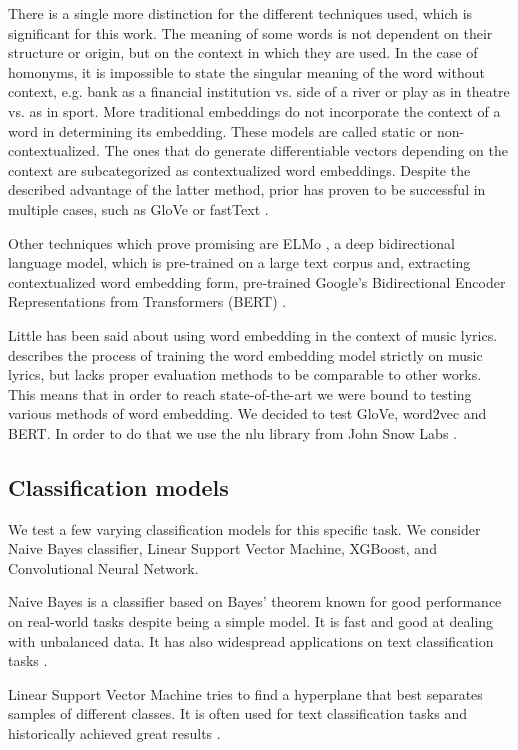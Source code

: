 There is a single more distinction for the different techniques used, which is significant for this work. The meaning of some words is not dependent on their structure or origin, but on the context in which they are used. In the case of homonyms, it is impossible to state the singular meaning of the word without context, e.g. bank as a financial institution vs. side of a river or play as in theatre vs. as in sport. More traditional embeddings do not incorporate the context of a word in determining its embedding. These models are called static or non-contextualized. The ones that do generate differentiable vectors depending on the context are subcategorized as contextualized word embeddings. Despite the described advantage of the latter method, prior has proven to be successful in multiple cases, such as GloVe \cite{glove} or fastText \cite{fastText}.

Other techniques which prove promising are ELMo \cite{elmo}, a deep bidirectional language model, which is pre-trained on a large text corpus and, extracting contextualized word embedding form, pre-trained Google’s Bidirectional Encoder Representations from Transformers (BERT) \cite{bert}. 

Little has been said about using word embedding in the context of music lyrics. \cite{musicWordEmbed} describes the process of training the word embedding model strictly on music lyrics, but lacks proper evaluation methods to be comparable to other works. This means that in order to reach state-of-the-art we were bound to testing various methods of word embedding. We decided to test GloVe, word2vec and BERT. In order to do that we use the nlu library from John Snow Labs \cite{nlu}.

\subsection{Classification models}

We test a few varying classification models for this specific task. We consider Naive Bayes classifier, Linear Support Vector Machine, XGBoost, and Convolutional Neural Network.

Naive Bayes is a classifier based on Bayes' theorem known for good performance on real-world tasks despite being a simple model. It is fast and good at dealing with unbalanced data. It has also widespread applications on text classification tasks \cite{naiveBayesRef}.

Linear Support Vector Machine tries to find a hyperplane that best separates samples of different classes. It is often used for text classification tasks and historically achieved great results \cite{svmRef}.

